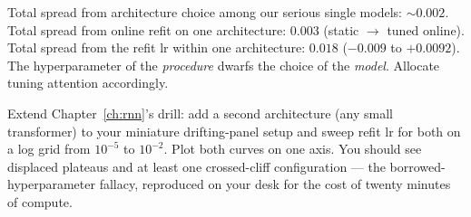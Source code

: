 \begin{jsbox}
Total spread from architecture choice among our serious single models:
$\sim 0.002$. Total spread from online refit on one architecture:
$\bm{0.003}$ (static $\to$ tuned online). Total spread from the refit
lr within one architecture: $\bm{0.018}$ ($-0.009$ to $+0.0092$).
The hyperparameter of the \emph{procedure} dwarfs the choice of the
\emph{model}. Allocate tuning attention accordingly.
\end{jsbox}

\begin{drillbox}
Extend Chapter~\ref{ch:rnn}'s drill: add a second architecture (any small
transformer) to your miniature drifting-panel setup and sweep refit lr
for both on a log grid from $10^{-5}$ to $10^{-2}$. Plot both curves on
one axis. You should see displaced plateaus and at least one
crossed-cliff configuration --- the borrowed-hyperparameter fallacy,
reproduced on your desk for the cost of twenty minutes of compute.
\end{drillbox}
